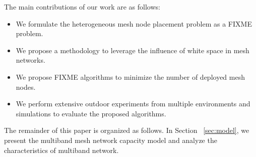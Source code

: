 % 
The main contributions of our work are as follows:
\begin{itemize}
\item We formulate the heterogeneous mesh node placement problem as a FIXME problem.  

\item We propose a methodology to leverage the influence of white space in mesh networks.

\item We propose FIXME algorithms to minimize the number of deployed mesh nodes.

\item We perform extensive outdoor experiments from multiple environments and simulations to evaluate the proposed algorithms.


\end{itemize}



The remainder of this paper is organized as follows. In Section ~\ref{sec:model}, we present the multiband mesh network capacity model and analyze the characteristics of multiband network. 

